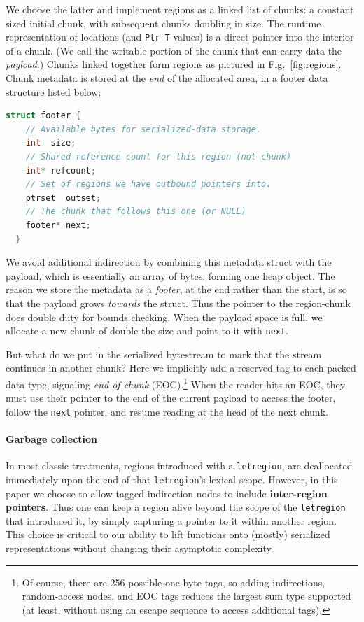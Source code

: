 \documentclass[showabstract,showacknowledgments,showpreface,showdedication,school]{iuphd}
\theoremstyle{nonumberplain}
\newcommand{\figref}[1]{Fig.~\ref{#1}}
\newcommand{\il}[1]{\lstinline[style=inline,mathescape=true];#1;}
\begin{document}
We choose the latter and implement regions as a linked list of chunks: a
constant sized initial chunk, with subsequent chunks doubling in size.
The runtime representation of locations (and \il{Ptr T} values)
is a direct pointer into the interior of a chunk.
(We call the writable portion of the chunk that can carry data the {\em payload}.)
Chunks linked together form regions as pictured in
\figref{fig:regions}.  Chunk metadata is stored at the \emph{end} of the
allocated area, in a footer data structure listed below:
\begin{lstlisting}[language=C++]
  struct footer {
    // Available bytes for serialized-data storage.
    int  size;
    // Shared reference count for this region (not chunk)
    int* refcount;
    // Set of regions we have outbound pointers into.
    ptrset  outset;
    // The chunk that follows this one (or NULL)
    footer* next;
  }
\end{lstlisting}
We avoid additional indirection by combining this metadata struct with the
payload, which is essentially an array of bytes, forming one heap object.
The reason we store the metadata as a \emph{footer}, at the end rather than the
start, is so that the payload grows \emph{towards} the struct.  Thus the pointer
to the region-chunk does double duty for bounds checking.  When the payload
space is full, we allocate a new chunk of double the size and point to it with
\il{next}.

But what do we put in the serialized bytestream to mark that the stream
continues in another chunk?  Here we implicitly add a reserved tag to each
packed data type, signaling {\em end of chunk} (EOC).\footnote{Of course, there
  are 256 possible one-byte tags, so adding indirections, random-access nodes,
  and EOC tags reduces the largest sum type supported (at least, without using
  an escape sequence to access additional tags).}
When the reader hits an EOC, they must use their pointer to the end of the
current payload to access the footer, follow the \il{next} pointer, and resume
reading at the head of the next chunk.



\paragraph{Garbage collection}

In most classic treatments, regions introduced with a \il{letregion},
are deallocated immediately upon the end of that \il{letregion}'s lexical
scope.
However, in this paper we choose to allow tagged indirection nodes to include
{\bf inter-region pointers}.  Thus one can keep a region alive beyond the scope of the
\il{letregion} that introduced it, by simply capturing a pointer to it within
another region.
This choice is critical to our ability to lift functions onto (mostly)
serialized representations without changing their asymptotic complexity.
\end{document}
